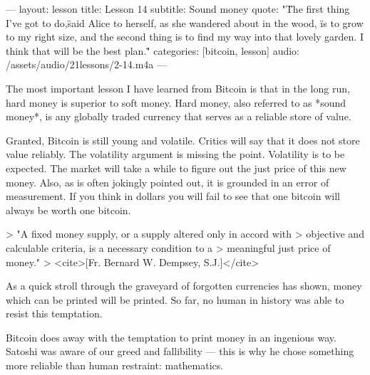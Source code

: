 ---
layout: lesson
title: Lesson 14
subtitle: Sound money
quote: "\"The first thing I've got to do,\" said Alice to herself, as she wandered about in the wood, \"is to grow to my right size, and the second thing is to find my way into that lovely garden. I think that will be the best plan.\""
categories: [bitcoin, lesson]
audio: /assets/audio/21lessons/2-14.m4a 
---

The most important lesson I have learned from Bitcoin is that in the
long run, hard money is superior to soft money. Hard money, also
referred to as *sound money*, is any globally traded currency that
serves as a reliable store of value.

Granted, Bitcoin is still young and volatile. Critics will say that it
does not store value reliably. The volatility argument is missing the
point. Volatility is to be expected. The market will take a while to
figure out the just price of this new money. Also, as is often jokingly
pointed out, it is grounded in an error of measurement. If you think in
dollars you will fail to see that one bitcoin will always be worth one
bitcoin.

> "A fixed money supply, or a supply altered only in accord with
> objective and calculable criteria, is a necessary condition to a
> meaningful just price of money."
> <cite>[Fr. Bernard W. Dempsey, S.J.]</cite>

As a quick stroll through the graveyard of forgotten currencies has
shown, money which can be printed will be printed. So far, no human in
history was able to resist this temptation.

Bitcoin does away with the temptation to print money in an ingenious
way. Satoshi was aware of our greed and fallibility --- this is why he
chose something more reliable than human restraint: mathematics.

